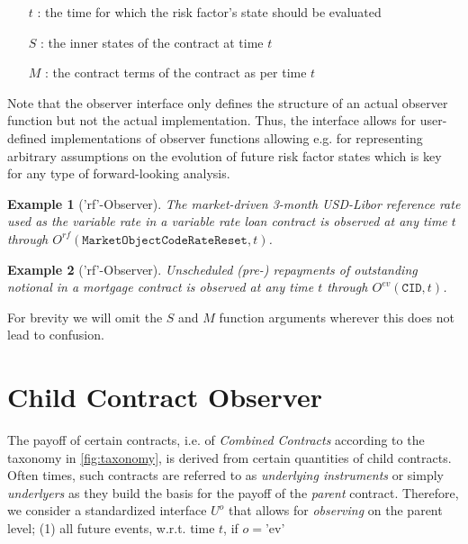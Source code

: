 \documentclass[9pt,oneside]{amsart}
\newtheorem{example}{Example}
\newcommand{\attr}[1]{\texttt{#1}}
\newcommand{\obs}[3]{O^{#1}(#2,#3)}
\newcommand{\cldfunc}[1]{U^{#1}}
\begin{document}
\begin{multicols}{2}
\begin{itemize}
	\item[$t$]: the time for which the risk factor’s state should be evaluated

	\item [$S$]: the inner states of the contract at time $t$

	\item [$M$]: the contract terms of the contract as per time $t$
\end{itemize}

Note that the observer interface only defines the structure of an actual observer function but not the actual implementation. Thus, the interface allows for user-defined implementations of observer functions allowing e.g. for representing arbitrary assumptions on the evolution of future risk factor states which is key for any type of forward-looking analysis.

\begin{example}['rf'-Observer] The market-driven 3-month USD-Libor reference rate used as the variable rate in a variable rate loan contract is observed at any time $t$ through $\obs{rf}{\attr{MarketObjectCodeRateReset}}{t}$.
\end{example}

\begin{example}['rf'-Observer] Unscheduled (pre-) repayments of outstanding notional in a mortgage contract is observed at any time $t$ through $\obs{ev}{\attr{CID}}{t}$.
\end{example}

For brevity we will omit the $S$ and $M$ function arguments wherever this does not lead to confusion.




\section{Child Contract Observer}\label{cldobs}

The payoff of certain contracts, i.e. of \textit{Combined Contracts} according to the taxonomy in \ref{fig:taxonomy}, is derived from certain quantities of child contracts. Often times, such contracts are referred to as \textit{underlying instruments} or simply \textit{underlyers} as they build the basis for the payoff of the \textit{parent} contract. Therefore, we consider a standardized interface $\cldfunc{o}$ that allows for \textit{observing} on the parent level; (1) all future events, w.r.t. time $t$, if $o=$'ev'


\end{multicols}
\end{document}
